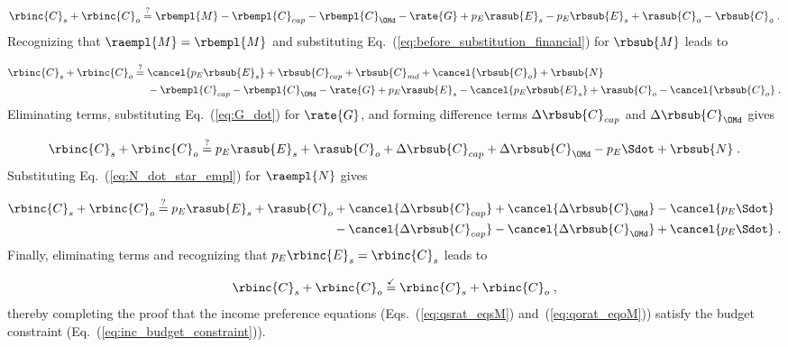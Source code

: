 \begin{equation}
  \rbinc{C}_s + \rbinc{C}_o \stackrel{?}{=} \rbempl{M} - \rbempl{C}_{cap} - \rbempl{C}_{\OMd} - \rate{G} 
            + p_E \rasub{E}_s - p_E \rbsub{E}_s + \rasub{C}_o - \rbsub{C}_o \; .
\end{equation}
%
Recognizing that $\raempl{M} = \rbempl{M}$ and 
substituting Eq.~(\ref{eq:before_substitution_financial}) for $\rbsub{M}$
leads to 

\begin{align}
  \rbinc{C}_s + \rbinc{C}_o \stackrel{?}{=} \; & \cancel{p_E \rbsub{E}_s} + \rbsub{C}_{cap} + \rbsub{C}_{md}
                                              + \cancel{\rbsub{C}_o} + \rbsub{N} \nonumber \\
                                            & - \rbempl{C}_{cap} - \rbempl{C}_{\OMd} - \rate{G}
                                              + p_E \rasub{E}_s - \cancel{p_E \rbsub{E}_s}
                                              + \rasub{C}_o - \cancel{\rbsub{C}_o} \; .
\end{align}
%
Eliminating terms, substituting Eq.~(\ref{eq:G_dot}) for $\rate{G}$, and 
forming difference terms $\Delta \rbsub{C}_{cap}$ and $\Delta \rbsub{C}_{\OMd}$ gives

\begin{equation}
  \rbinc{C}_s + \rbinc{C}_o \stackrel{?}{=} p_E \rasub{E}_s + \rasub{C}_o
                                            + \Delta \rbsub{C}_{cap} + \Delta \rbsub{C}_{\OMd}
                                            - p_E \Sdot + \rbsub{N} \; .
\end{equation}
%
Substituting Eq.~(\ref{eq:N_dot_star_empl}) for $\raempl{N}$ gives 

\begin{align}
  \rbinc{C}_s + \rbinc{C}_o \stackrel{?}{=} p_E \rasub{E}_s + \rasub{C}_o
        & + \cancel{\Delta \rbsub{C}_{cap}} + \cancel{\Delta \rbsub{C}_{\OMd}} - \cancel{p_E \Sdot} \nonumber \\
        & - \cancel{\Delta \rbsub{C}_{cap}} - \cancel{\Delta \rbsub{C}_{\OMd}} + \cancel{p_E \Sdot} \; .
\end{align}
%
Finally, eliminating terms and recognizing that $p_E \rbinc{E}_s = \rbinc{C}_s$ leads to

\begin{equation}
  \rbinc{C}_s + \rbinc{C}_o \stackrel{\checkmark}{=} \rbinc{C}_s + \rbinc{C}_o \; ,
\end{equation}
%
thereby completing the proof that the income preference equations
(Eqs.~(\ref{eq:qsrat_eqsM}) and~(\ref{eq:qorat_eqoM}))
satisfy the budget constraint
(Eq.~(\ref{eq:inc_budget_constraint})).